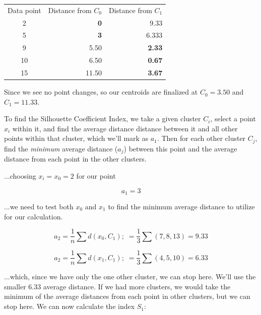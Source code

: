 \documentclass{article}
\begin{document}
\begin{center}
    \begin{tabular}{c r r}
        Data point & Distance from $C_0$ & Distance from $C_1$\\
        2 & \textbf{0} & 9.33 \\
        5 & \textbf{3} & 6.333 \\
        9 & 5.50 & \textbf{2.33} \\
        10 & 6.50 & \textbf{0.67} \\
        15 & 11.50 & \textbf{3.67} \\
    \end{tabular}
\end{center}

\noindent Since we see no point changes, so our centroids are finalized at $C_0=3.50$ and $C_1=11.33$.


To find the Silhouette Coefficient Index, we take a given cluster $C_i$, select a point $x_i$ within it, and find the average distance distance between it and all other points within that cluster, which we'll mark as $a_1$. Then for each other cluster $C_j$, find the \textit{minimum} average distance ($a_j$) between this point and the average distance from each point in the other clusters.

\noindent ...choosing $x_i=x_0=2$ for our point

\begin{equation}
    a_1 = 3
\end{equation}

\noindent ...we need to test both $x_0$ and $x_1$ to find the minimum average distance to utilize for our calculation.

\begin{equation}
    a_2 = \frac{1}{n} \sum d(x_0, C_1); \; = \frac{1}{3} \sum (7, 8, 13) = 9.33
\end{equation}

\begin{equation}
    a_2 = \frac{1}{n} \sum d(x_1, C_1); \; = \frac{1}{3} \sum (4, 5, 10) = 6.33
\end{equation}


\noindent ...which, since we have only the one other cluster, we can stop here. We'll use the smaller $6.33$ average distance. If we had more clusters, we would take the minimum of the average distances from each point in other clusters, but we can stop here. We can now calculate the index $S_1$:
\end{document}
